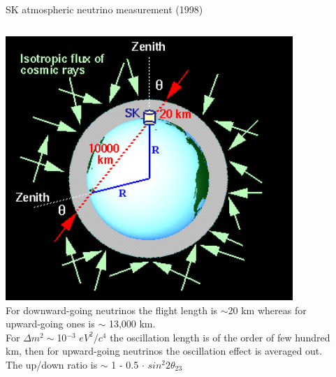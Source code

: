 \begin{frame}[t]{SK atmospheric neutrino measurement (1998)}

\begin{columns}
  \begin{column}{0.50\textwidth}
   {
    \centering
    \includegraphics[width=0.85\textwidth]{./images/3nu/atmo/up_down_schematic.png}\\
   }
   {\scriptsize
    For downward-going neutrinos the flight length is $\sim$20 km whereas
    for upward-going ones is $\sim$ 13,000 km.\\
    For ${\Delta}m^{2}\sim$10$^{-3}$ $eV^{2}/c^{4}$ the oscillation length is of the order
    of few hundred km, then for upward-going neutrinos the oscillation effect is averaged out.\\
    The up/down ratio is $\sim$ 1 - 0.5 $\cdot$ $sin^{2}2\theta_{23}$\\
   }
  \end{column}
  \begin{column}{0.50\textwidth}

\end{column}
\end{columns}
\end{frame}
